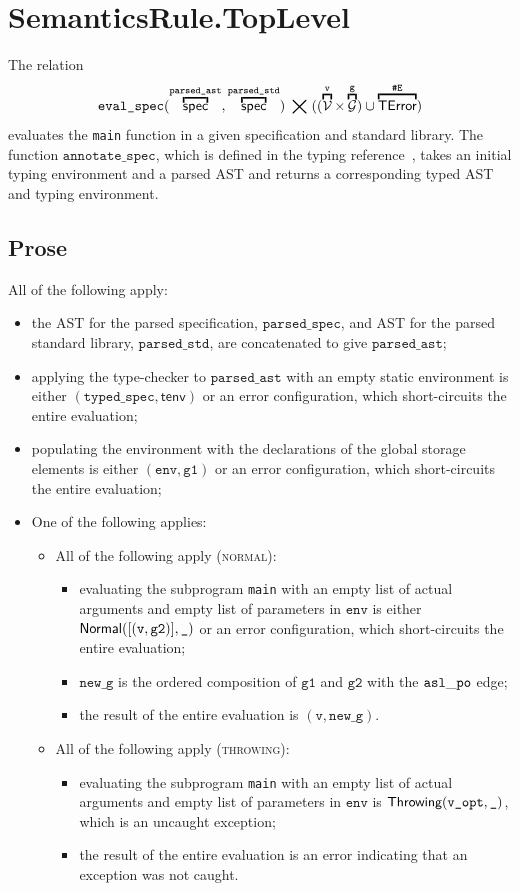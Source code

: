 \documentclass{book}
\newcommand\overname[2]{\overbracket{#1}^{#2}}
\newcommand\XGraphs[0]{\mathcal{G}}
\newcommand\tenv[0]{\textsf{tenv}}
\newcommand\vals[0]{\mathcal{V}}
\newcommand\aslrel[0]{\bigtimes}
\newcommand\ErrorConfig[0]{\texttt{\#E}}
\newcommand\ProseOrError[0]{or an error configuration, which short-circuits the entire evaluation}
\newcommand\TError[0]{\textsf{TError}}
\newcommand\parsedspec[0]{\texttt{parsed\_spec}}
\newcommand\parsedstd[0]{\texttt{parsed\_std}}
\newcommand\parsedast[0]{\texttt{parsed\_ast}}
\newcommand\typedspec[0]{\texttt{typed\_spec}}
\newcommand\evalspec[1]{\texttt{eval\_spec}(#1)}
\newcommand\Normal[0]{\textsf{Normal}}
\newcommand\Throwing[0]{\textsf{Throwing}}
\newcommand\env[0]{\texttt{env}}
\newcommand\vg[0]{\texttt{g}}
\newcommand\newg[0]{\texttt{new\_g}}
\newcommand\vv[0]{\texttt{v}}
\newcommand\vgone[0]{\texttt{g1}}
\newcommand\vgtwo[0]{\texttt{g2}}
\begin{document}
\section{SemanticsRule.TopLevel \label{sec:SemanticsRule.TopLevel}}
The relation
\[
  \evalspec{\overname{\spec}{\parsedast}, \overname{\spec}{\parsedstd}} \;\aslrel\;
   ((\overname{\vals}{\vv}\times \overname{\XGraphs}{\vg}) \cup \overname{\TError}{\ErrorConfig})
\]
evaluates the \texttt{main} function in a given specification and standard library.
The function $\texttt{annotate\_spec}$, which is defined in the typing reference~\cite{ASLTypingReference},
takes an initial typing environment and a parsed AST and returns a corresponding typed AST and typing
environment.

\subsection{Prose}
  All of the following apply:
  \begin{itemize}
    \item the AST for the parsed specification, $\parsedspec$, and AST for the parsed standard library,
    $\parsedstd$, are concatenated to give $\parsedast$;
    \item applying the type-checker to $\parsedast$ with an empty static environment is either
    $(\typedspec, \tenv)$ \ProseOrError;
    \item populating the environment with the declarations of the global storage elements
    is either $(\env, \vgone)$ \ProseOrError;
    \item One of the following applies:
    \begin{itemize}
      \item All of the following apply (\textsc{normal}):
      \begin{itemize}
        \item evaluating the subprogram \texttt{main} with an empty list of actual arguments and empty list of parameters
        in $\env$ is either $\Normal([(\vv, \vgtwo)], \Ignore)$ \ProseOrError;
        \item $\newg$ is the ordered composition of $\vgone$ and $\vgtwo$ with the $\mathtt{asl\_po}$ edge;
        \item the result of the entire evaluation is $(\vv, \newg)$.
      \end{itemize}

      \item All of the following apply (\textsc{throwing}):
      \begin{itemize}
        \item evaluating the subprogram \texttt{main} with an empty list of actual arguments and empty list of parameters
        in $\env$ is $\Throwing(\texttt{v\_opt}, \Ignore)$, which is an uncaught exception;
        \item the result of the entire evaluation is an error indicating that an exception was not caught.
      \end{itemize}
    \end{itemize}
  \end{itemize}
\end{document}
